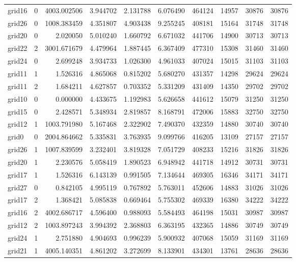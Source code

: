\begin{longtable}{|l|r|r|r|r|r|r|r|r|r|}
grid16 & 0 & 4003.002506 & 3.944702 & 2.131788 & 6.076490 & 464124 & 14957 & 30876 & 30876 \\
grid26 & 0 & 1008.383459 & 4.351807 & 4.903438 & 9.255245 & 408181 & 15164 & 31748 & 31748 \\
grid20 & 0 & 2.020050 & 5.010240 & 1.660792 & 6.671032 & 441706 & 14900 & 30713 & 30713 \\
grid22 & 2 & 3001.671679 & 4.479964 & 1.887445 & 6.367409 & 477310 & 15308 & 31460 & 31460 \\
grid24 & 0 & 2.699248 & 3.934733 & 1.026300 & 4.961033 & 407024 & 15015 & 31103 & 31103 \\
grid11 & 1 & 1.526316 & 4.865068 & 0.815202 & 5.680270 & 431357 & 14298 & 29624 & 29624 \\
grid11 & 2 & 1.684211 & 4.627857 & 0.703352 & 5.331209 & 431409 & 14350 & 29702 & 29702 \\
grid10 & 0 & 0.000000 & 4.433675 & 1.192983 & 5.626658 & 441612 & 15079 & 31250 & 31250 \\
grid15 & 0 & 2.428571 & 5.348934 & 2.819857 & 8.168791 & 472006 & 15883 & 32750 & 32750 \\
grid12 & 1 & 1003.791980 & 5.167468 & 2.322902 & 7.490370 & 432359 & 14880 & 30740 & 30740 \\
grid0 & 0 & 2004.864662 & 5.335831 & 3.763935 & 9.099766 & 416205 & 13109 & 27157 & 27157 \\
grid26 & 1 & 1007.839599 & 3.232401 & 3.819328 & 7.051729 & 408233 & 15216 & 31826 & 31826 \\
grid20 & 1 & 2.230576 & 5.058419 & 1.890523 & 6.948942 & 441718 & 14912 & 30731 & 30731 \\
grid17 & 1 & 1.526316 & 6.143139 & 0.991505 & 7.134644 & 469305 & 16346 & 34171 & 34171 \\
grid27 & 0 & 0.842105 & 4.995119 & 0.767892 & 5.763011 & 452606 & 14883 & 31026 & 31026 \\
grid17 & 2 & 1.368421 & 5.085838 & 0.669464 & 5.755302 & 469339 & 16380 & 34222 & 34222 \\
grid16 & 2 & 4002.686717 & 4.596400 & 0.988093 & 5.584493 & 464198 & 15031 & 30987 & 30987 \\
grid12 & 2 & 1003.897243 & 3.994392 & 2.368803 & 6.363195 & 432365 & 14886 & 30749 & 30749 \\
grid24 & 1 & 2.751880 & 4.904693 & 0.996239 & 5.900932 & 407068 & 15059 & 31169 & 31169 \\
grid21 & 1 & 4005.140351 & 4.861202 & 3.272699 & 8.133901 & 434301 & 13761 & 28636 & 28636 \\

\end{longtable}
